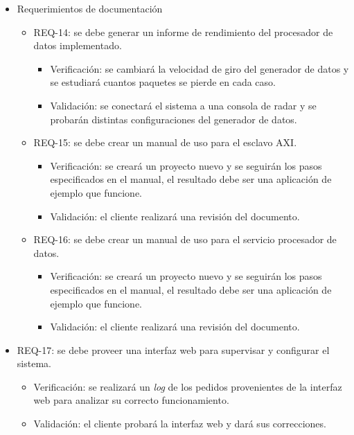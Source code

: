 \documentclass[
11pt, %
]{charter}
\begin{document}
\begin{itemize}
	\item Requerimientos de documentación
		\begin{itemize}
      \item REQ-14: se debe generar un informe de rendimiento del procesador de
        datos implementado.
        \begin{itemize}
          \item Verificación: se cambiará la velocidad de giro del generador de
            datos y se estudiará cuantos paquetes se pierde en cada caso.
          \item Validación: se conectará el sistema a una consola de radar y se
            probarán distintas configuraciones del generador de datos.
        \end{itemize}
      \item REQ-15: se debe crear un manual de uso para el esclavo AXI.
        \begin{itemize}
          \item Verificación: se creará un proyecto nuevo y se seguirán los
            pasos especificados en el manual, el resultado debe ser una
            aplicación de ejemplo que funcione.
          \item Validación: el cliente realizará una revisión del documento.
        \end{itemize}
      \item REQ-16: se debe crear un manual de uso para el servicio procesador de datos.
        \begin{itemize}
          \item Verificación: se creará un proyecto nuevo y se seguirán los
          pasos especificados en el manual, el resultado debe ser una
          aplicación de ejemplo que funcione.
          \item Validación: el cliente realizará una revisión del documento.
        \end{itemize}
      \end{itemize}
    \item REQ-17: se debe proveer una interfaz web para supervisar y configurar el sistema.
      \begin{itemize}
        \item Verificación: se realizará un \emph{log} de los pedidos
          provenientes de la interfaz web para analizar su correcto funcionamiento.
        \item Validación: el cliente probará la interfaz web y dará sus correcciones.
      \end{itemize}
\end{itemize}
\end{document}
